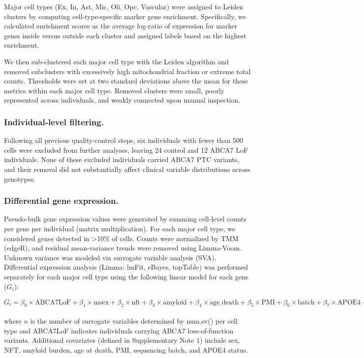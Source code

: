 Major cell types (Ex, In, Ast, Mic, Oli, Opc, Vascular) were assigned to Leiden clusters by computing cell-type-specific marker gene enrichment. Specifically, we calculated enrichment scores as the average log-ratio of expression for marker genes inside versus outside each cluster and assigned labels based on the highest enrichment.

We then sub-clustered each major cell type with the Leiden algorithm and removed subclusters with excessively high mitochondrial fraction or extreme total counts. Thresholds were set at two standard deviations above the mean for these metrics within each major cell type. Removed clusters were small, poorly represented across individuals, and weakly connected upon manual inspection.

\subsubsection{Individual-level filtering.}
Following all previous quality-control steps, six individuals with fewer than 500 cells were excluded from further analyses, leaving 24 control and 12 ABCA7 LoF individuals. None of these excluded individuals carried ABCA7 PTC variants, and their removal did not substantially affect clinical variable distributions across genotypes.

\subsubsection{Differential gene expression.}
Pseudo-bulk gene expression values were generated by summing cell-level counts per gene per individual (matrix multiplication). For each major cell type, we considered genes detected in >10\% of cells. Counts were normalized by TMM (edgeR), and residual mean-variance trends were removed using Limma-Voom. Unknown variance was modeled via surrogate variable analysis (SVA). Differential expression analysis (Limma: lmFit, eBayes, topTable) was performed separately for each major cell type using the following linear model for each gene ($G_i$):

$ G_i = \beta_0 \times \text{ABCA7LoF} + \beta_1 \times \text{msex} + \beta_2 \times \text{nft} + \beta_3 \times \text{amyloid} + \beta_4 \times \text{age\_death} + \beta_5 \times \text{PMI} + \beta_6 \times \text{batch} + \beta_7 \times \text{APOE4} + \sum_{j=1}^{n} \beta_{\text{SV}_j} \times \text{SV}_j$

where $n$ is the number of surrogate variables determined by num.sv() per cell type and  ABCA7LoF indicates individuals carrying ABCA7 loss-of-function variants. Additional covariates (defined in Supplementary Note 1) include sex, NFT, amyloid burden, age at death, PMI, sequencing batch, and APOE4 status.

